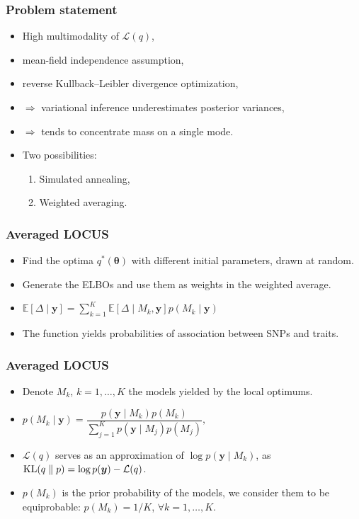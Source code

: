 \documentclass{beamer}
\DeclareMathOperator*{\KL}{{\rm KL}}
\begin{document}
\begin{frame}
\frametitle{Problem statement}
\begin{itemize}
\item High multimodality of $\mathcal{L}(q)$,
\item mean-field independence assumption,
\item reverse Kullback--Leibler divergence optimization,
\item $\Rightarrow$ variational inference underestimates posterior variances,
\item $\Rightarrow$ tends to concentrate mass on a single mode.
\item Two possibilities:
\begin{enumerate}
\item Simulated annealing,
\item Weighted averaging.
\end{enumerate}
\end{itemize}
\end{frame}

\begin{frame}
\frametitle{Averaged LOCUS}
\begin{itemize}
\item Find the optima $q^*(\boldsymbol{\theta})$ with different initial parameters, drawn at random.
\item Generate the ELBOs and use them as weights in the weighted average.
\item $\mathbb{E}\left[\Delta\mid \boldsymbol{y}\right]= \sum_{k=1}^K \mathbb{E}\left[\Delta\mid M_k,\boldsymbol{y}\right]p(M_k\mid\boldsymbol{y})$
\item The function yields probabilities of association between SNPs and traits.
\end{itemize}
\end{frame}


\begin{frame}
\frametitle{Averaged LOCUS}
\begin{itemize}
\item Denote $M_k$, $k= 1,\ldots, K$ the models yielded by the local optimums.
\item $p(M_k \mid \boldsymbol{y}) = \dfrac{p(\boldsymbol{y} \mid M_k)p(M_k)}{\sum_{j=1}^{K}p(\boldsymbol{y}\mid M_j)p(M_j)},$
\item $\mathcal{L}(q)$ serves as an approximation of $\log p(\boldsymbol{y} \mid M_k)$, as $\KL(q\parallel p) = \log p(\boldsymbol{y}) - \mathcal{L}(q)$.
\item $p(M_k)$ is the prior probability of the models, we consider them to be equiprobable: $p(M_k) = 1/K$, $\forall k = 1,\ldots,K$.
\end{itemize}
\end{frame}
\end{document}
